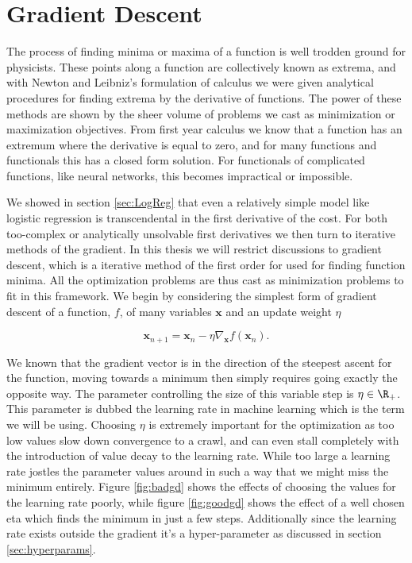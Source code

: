 \section{Gradient Descent}\label{sec:gd}

The process of finding minima or maxima of a function is well trodden ground for physicists. These points along a function are collectively known as extrema, and with Newton and Leibniz's formulation of calculus we were given analytical procedures for finding extrema by the derivative of functions. The power of these methods are shown by the sheer volume of problems we cast as minimization or maximization objectives. From first year calculus we know that a function has an extremum where the derivative is equal to zero, and for many functions and functionals this has a closed form solution. For functionals of complicated functions, like neural networks, this becomes impractical or impossible. 

We showed in section \ref{sec:LogReg} that even a relatively simple model like logistic regression is transcendental in the first derivative of the cost. For both too-complex or analytically unsolvable first derivatives we then turn to iterative methods of the gradient. In this thesis we will restrict discussions to gradient descent, which is a iterative method of the first order for used for finding function minima. All the optimization problems are thus cast as minimization problems to fit in this framework. We begin by considering the simplest form of gradient descent of a function, $f$, of many variables $\mathbf{x}$ and an update weight $\eta$

\begin{equation}\label{eq:gd}
\mathbf{x}_{n+1} = \mathbf{x}_{n} - \eta \nabla_\mathbf{x} f(\mathbf{x}_{n}). 
\end{equation} 

\noindent We known that the gradient vector is in the direction of the steepest ascent for the function, moving towards a minimum then simply requires going exactly the opposite way. The parameter controlling the size of this variable step is  $\eta \in \R_+$. This parameter is dubbed the learning rate in machine learning which is the term we will be using. Choosing $\eta$ is extremely important for the optimization as too low values slow down convergence to a crawl, and can even stall completely with the introduction of value decay to the learning rate. While too large a learning rate jostles the parameter values around in such a way that we might miss the minimum entirely. Figure \ref{fig:badgd} shows the effects of choosing the values for the learning rate poorly, while figure \ref{fig:goodgd} shows the effect of a well chosen eta which finds the minimum in just a few steps. Additionally since the learning rate exists outside the gradient it's a hyper-parameter as discussed in section \ref{sec:hyperparams}. 


